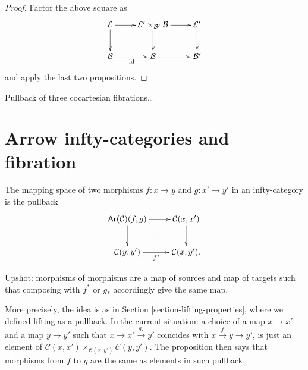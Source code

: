 \begin{proof}
Factor the above square as
$$
\xymatrix{
\mathcal{E}\ar[r]\ar[d]&\mathcal{E}
'\times_{\mathcal{B}'}\mathcal{B}\ar[d]\ar[r]
&\mathcal{E}'\ar[d]\\
\mathcal{B}\ar[r]_{\text{id}}&\mathcal{B}
\ar[r]&\mathcal{B}'
}
$$
and apply the last two propositions.
\end{proof}

\begin{exercise}
\label{exercise-pullback-of-three-fibrations}
Pullback of three cocartesian fibrations…
\end{exercise}






\section{Arrow infty-categories and
fibration}
\label{section-arrow-infty-categories}

\begin{proposition}
\label{proposition-pullb-arrow-categ}
The mapping space of two morphisms
$f:x \to y$ and $g:x'\to y'$ in an
infty-category is the pullback
$$
\xymatrix{
\mathsf{Ar}(\mathcal{C})(f,g)\ar[r]\ar[d]
\ar@{}[dr]|-{\lrcorner}
&\mathcal{C}(x,x')\ar[d]\\
\mathcal{C}(y,y')\ar[r]_{f^*}&
\mathcal{C}(x,y').
}
$$
\end{proposition}

\noindent
Upshot: morphisms of morphisms are
a map of sources and map of targets such that
composing with $f^*$ or $g_*$ accordingly
give the same map.

More precisely,
the idea is as in Section
\ref{section-lifting-properties},
where we defined lifting as a pullback.
In the current situation: a choice of
a map $x \to x'$ and a map $y \to y'$
such that $x \to x' \xrightarrow{g_*}y'$
coincides with
$x \xrightarrow{f} y \to y'$,
is just an element of
$\mathcal{C}(x,x')\times_{\mathcal{C}(x,y')}
\mathcal{C}(y,y')$.
The proposition then says that morphisms from
$f$ to $g$
are the same as elements in such pullback.

